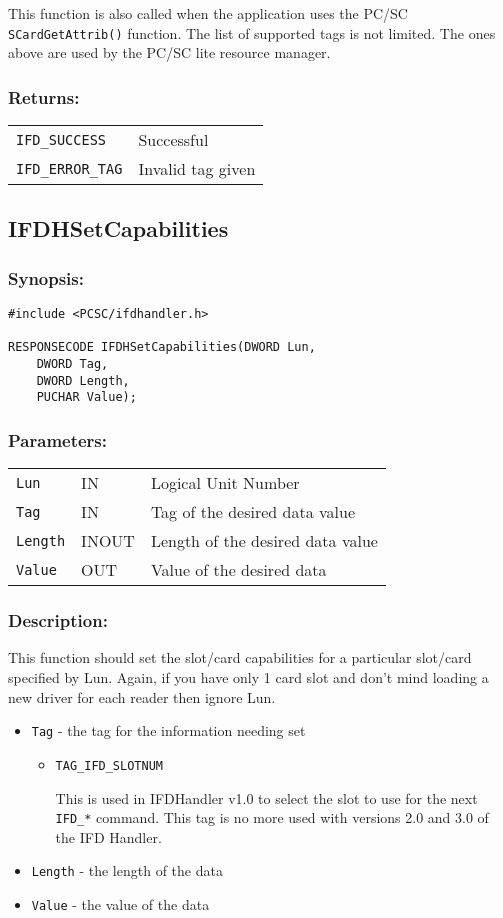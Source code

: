 \documentclass[a4paper,12pt]{article}
\newcommand{\synopsis}{\subsubsection{Synopsis:}}
\newcommand{\parameters}{\subsubsection{Parameters:}}
\newcommand{\desc}{\subsubsection{Description:}}
\newcommand{\returns}{\subsubsection{Returns:}}
\begin{document}
This function is also called when the application uses the PC/SC
\texttt{SCardGetAttrib()} function. The list of supported tags is not
limited.  The ones above are used by the PC/SC lite resource manager.

\returns

\begin{tabular}{ll}
\texttt{IFD\_SUCCESS} & Successful\\
\texttt{IFD\_ERROR\_TAG} & Invalid tag given
\end{tabular}


\subsection{IFDHSetCapabilities}

\synopsis
\begin{verbatim}
#include <PCSC/ifdhandler.h>

RESPONSECODE IFDHSetCapabilities(DWORD Lun,
    DWORD Tag,
    DWORD Length,
    PUCHAR Value);
\end{verbatim}

\parameters

\begin{tabular}{lll}
\texttt{Lun} & IN & Logical Unit Number\\
\texttt{Tag} & IN & Tag of the desired data value\\
\texttt{Length} & INOUT & Length of the desired data value\\
\texttt{Value} & OUT & Value of the desired data\\
\end{tabular}

\desc

This function should set the slot/card capabilities for a particular
slot/card specified by Lun. Again, if you have only 1 card slot and
don't mind loading a new driver for each reader then ignore Lun.

\begin{itemize}
\item \texttt{Tag} - the tag for the information needing set

\begin{itemize}
\item \texttt{TAG\_IFD\_SLOTNUM}

This is used in IFDHandler v1.0 to select the slot to use for the next
\texttt{IFD\_*} command. This tag is no more used with versions 2.0 and
3.0 of the IFD Handler.

\end{itemize}

\item \texttt{Length} - the length of the data
\item \texttt{Value} - the value of the data
\end{itemize}
\end{document}
